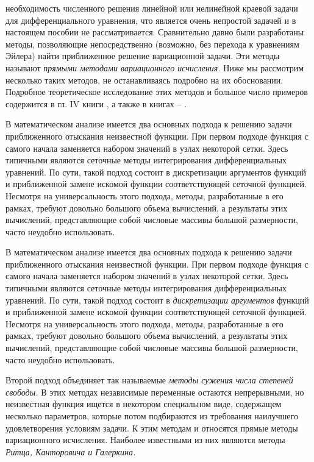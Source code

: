 	\newpage
	\noindent
	необходимость численного решения линейной или нелинейной краевой задачи для дифференциального уравнения, что является очень непростой задачей и в настоящем пособии не рассматривается. Сравнительно давно были разработаны методы, позволяющие непосредственно (возможно, без перехода к уравнениям Эйлера) найти приближенное решение вариационной задачи. Эти методы называют {\it прямыми методами вариационного исчисления.} Ниже мы рассмотрим несколько таких методов, не останавливаясь подробно на их обосновании. Подробное теоретическое исследование этих методов и большое число примеров содержится в гл. IV книги \cite{literature_kantorovich}, а также в книгах \cite{literature_mihlin_1970} – \cite{literature_mihlin_1966}.

	В математическом анализе имеется два основных подхода к решению задачи приближенного отыскания неизвестной функции. При первом подходе функция с самого начала заменяется набором значений в узлах некоторой сетки. Здесь типичными являются сеточные методы интегрирования дифференциальных уравнений. По сути, такой подход состоит в дискретизации аргументов функций и приближенной замене искомой функции соответствующей сеточной функцией. Несмотря на универсальность этого подхода, методы, разработанные в его рамках, требуют довольно большого объема вычислений, а результаты этих вычислений, представляющие собой числовые массивы большой размерности, часто неудобно использовать.

	В математическом анализе имеется два основных подхода к решению задачи приближенного отыскания неизвестной функции. При первом подходе функция с самого начала заменяется набором значений в узлах некоторой сетки. Здесь типичными являются сеточные методы интегрирования дифференциальных уравнений. По сути, такой подход состоит в {\it дискретизации аргументов} функций и приближенной замене искомой функции соответствующей сеточной функцией. Несмотря на универсальность этого подхода, методы, разработанные в его рамках, требуют довольно большого объема вычислений, а результаты этих вычислений, представляющие собой числовые массивы большой размерности, часто неудобно использовать.

	Второй подход объединяет так называемые {\it методы сужения числа степеней свободы.} В этих методах независимые переменные остаются непрерывными, но неизвестная функция ищется в некотором специальном виде, содержащем несколько параметров, которые потом подбираются из требования наилучшего удовлетворения  условиям задачи. К этим методам и относятся прямые методы вариационного исчисления. Наиболее известными из них являются методы {\it Ритца, Канторовича и Галеркина.}

